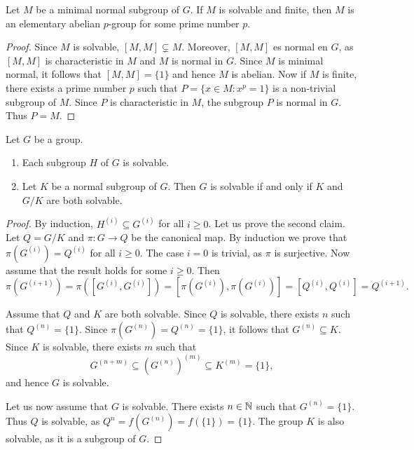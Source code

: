 \begin{lemma}
	\label{lemma:minimal_normal}
	Let $M$ be a minimal normal subgroup of $G$. If $M$ is solvable and finite, then
	$M$ is an elementary abelian $p$-group for some prime number $p$. 
\end{lemma}

\begin{proof}
	Since $M$ is solvable, $[M,M]\subsetneq M$. Moreover, $[M,M]$ es normal en $G$, as 
    $[M,M]$ is characteristic in $M$ and $M$ is normal in $G$. Since $M$ is minimal normal, 
    it follows that $[M,M]=\{1\}$ and hence $M$ is abelian. 
	Now if $M$ is finite, there exists a prime number $p$ such that 
	$P=\{x\in M:x^p=1\}$ is a non-trivial subgroup of $M$.  
	Since $P$ is characteristic in $M$, the subgroup
	$P$ is normal in $G$. Thus $P=M$. 
\end{proof}

\begin{theorem}
	\label{theorem:resoluble}
	Let $G$ be a group. 
	\begin{enumerate}
		\item Each subgroup $H$ of $G$ is solvable. 
		\item Let $K$ be a normal subgroup of $G$. Then $G$ is solvable
			if and only if $K$ and $G/K$ are both solvable.
	\end{enumerate}
\end{theorem}

\begin{proof}
    By induction, $H^{(i)}\subseteq G^{(i)}$ for all 
    $i\geq0$. Let us prove the second claim. Let $Q=G/K$ and $\pi\colon G\to Q$ be the canonical map. 
    By induction we prove that $\pi(G^{(i)})=Q^{(i)}$ for all 
	$i\geq0$. The case $i=0$ is trivial, as $\pi$ is surjective. Now assume that
	the result holds for some $i\geq0$. Then 
	\[
		\pi(G^{(i+1)})=\pi([G^{(i)},G^{(i)}])=[\pi(G^{(i)}),\pi(G^{(i)})]=[Q^{(i)},Q^{(i)}]=Q^{(i+1)}.
	\]

	Assume that $Q$ and $K$ are both solvable. Since $Q$ is solvable, 
	there exists $n$ such that $Q^{(n)}=\{1\}$.
	Since $\pi(G^{(n)})=Q^{(n)}=\{1\}$, it follows that $G^{(n)}\subseteq K$. Since $K$
	is solvable, there exists $m$ such that 
	\[
		G^{(n+m)}\subseteq (G^{(n)})^{(m)}\subseteq K^{(m)}=\{1\},
	\]
	and hence $G$ is solvable.  

	Let us now assume that $G$ is solvable. There exists $n\in\mathbb{N}$ such that $G^{(n)}=\{1\}$.
	Thus $Q$ is solvable, as $Q^{n}=f(G^{(n)})=f(\{1\})=\{1\}$. The group $K$ is also 
	solvable, as it is a subgroup of $G$. 
\end{proof}

